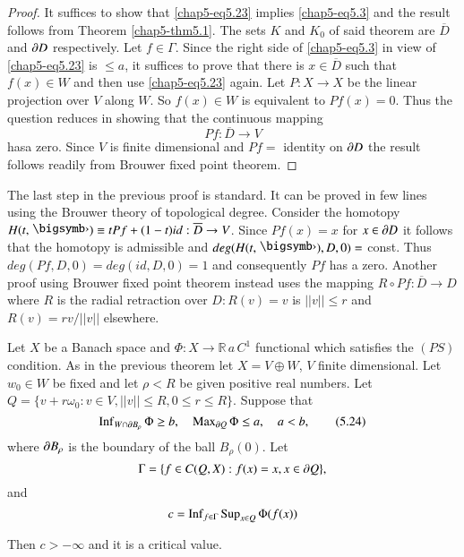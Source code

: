 \begin{proof}
It suffices to show that \eqref{chap5-eq5.23} implies
\eqref{chap5-eq5.3} and the result follows from Theorem
\ref{chap5-thm5.1}. The sets $K$ and $K_{0}$ of said theorem are
$\overline{D}$ and $\partial D$ respectively. Let $f\in \Gamma$. Since the
right side of \eqref{chap5-eq5.3} in view of \eqref{chap5-eq5.23} is
$\leq a$, it suffices to prove that there is $x\in\overline{D}$ such
that $f(x)\in W$ and then use \eqref{chap5-eq5.23} again. Let $P:X\to
X$ be the linear projection over $V$ along $W$. So $f(x)\in W$ is
equivalent to $Pf(x)=0$. Thus the question reduces in showing that the
continuous mapping
$$
Pf:\overline{D}\to V
$$
has\pageoriginale a zero. Since $V$ is finite dimensional and $Pf=$
identity on $\partial D$ the result follows readily from Brouwer fixed point
theorem. 
\end{proof}

\begin{remark*}
The last step in the previous proof is standard. It can be proved in
few lines using the Brouwer theory of topological degree. Consider the
homotopy $H(t,\bigdot)\equiv tPf+(1-t)id:\overline{D}\to V$. Since
$Pf(x)=x$ for $x\in \partial D$ it follows that the homotopy is admissible
and $deg(H(t,\bigdot),D,0)=$ const. Thus $deg(Pf,D,0)=deg(id,D,0)=1$
and consequently $Pf$ has a zero. Another proof using Brouwer fixed
point theorem instead uses the mapping $R\circ Pf:\overline{D}\to D$
where $R$ is the radial retraction over $D:R(v)=v$ is $||v||\leq r$
and $R(v)=rv/||v||$ elsewhere.
\end{remark*}

\begin{theorem}\label{chap5-thm5.9} 
Let $X$ be a Banach space and $\Phi:X\to \mathbb{R}\,a\,C^{1}$ functional
which satisfies the $(PS)$ condition. As in the previous theorem let
$X=V\oplus W$, $V$ finite dimensional. Let $w_{0}\in W$ be fixed and
let $\rho<R$ be given positive real numbers. Let
$Q=\{v+r\omega_{0}:v\in V,||v||\leq R,0\leq r\leq R\}$. Suppose that
\begin{equation*}
\operatorname{Inf}_{W\cap \partial B_{\rho}}\Phi\geq b,\quad \operatorname{Max}_{\partial Q}\Phi\leq a,\quad
a<b,\tag{5.24}\label{chap5-eq5.24} 
\end{equation*}
where $\partial B_{\rho}$ is the boundary of the ball $B_{\rho}(0)$. Let
$$
\Gamma=\{f\in C(Q,X):f(x)=x,x\in \partial Q\},
$$
and
$$
c=\operatorname{Inf}_{f\in \Gamma}\operatorname{Sup}_{x\in Q}\Phi(f(x))
$$

Then $c>-\infty$ and it is a critical value.
\end{theorem}

